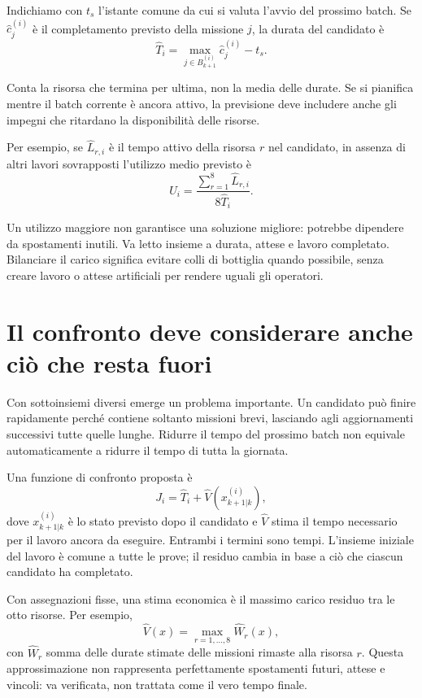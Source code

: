 \documentclass[a4paper,11pt]{article}
\begin{document}
Indichiamo con $t_s$ l'istante comune da cui si valuta l'avvio del prossimo batch. Se $\widehat c_j^{(i)}$ è il completamento previsto della missione $j$, la durata del candidato è
\begin{equation}
    \widehat T_i=\max_{j\in B_{k+1}^{(i)}}\widehat c_j^{(i)}-t_s.
\end{equation}

Conta la risorsa che termina per ultima, non la media delle durate. Se si pianifica mentre il batch corrente è ancora attivo, la previsione deve includere anche gli impegni che ritardano la disponibilità delle risorse.

Per esempio, se $\widehat L_{r,i}$ è il tempo attivo della risorsa $r$ nel candidato, in assenza di altri lavori sovrapposti l'utilizzo medio previsto è
\begin{equation}
    \widehat U_i=\frac{\sum_{r=1}^{8}\widehat L_{r,i}}{8\widehat T_i}.
\end{equation}

Un utilizzo maggiore non garantisce una soluzione migliore: potrebbe dipendere da spostamenti inutili. Va letto insieme a durata, attese e lavoro completato. Bilanciare il carico significa evitare colli di bottiglia quando possibile, senza creare lavoro o attese artificiali per rendere uguali gli operatori.

\section{Il confronto deve considerare anche ciò che resta fuori}

Con sottoinsiemi diversi emerge un problema importante. Un candidato può finire rapidamente perché contiene soltanto missioni brevi, lasciando agli aggiornamenti successivi tutte quelle lunghe. Ridurre il tempo del prossimo batch non equivale automaticamente a ridurre il tempo di tutta la giornata.

Una funzione di confronto proposta è
\begin{equation}
    J_i=\widehat T_i+\widehat V(x_{k+1|k}^{(i)}),
    \label{eq:costo}
\end{equation}
dove $x_{k+1|k}^{(i)}$ è lo stato previsto dopo il candidato e $\widehat V$ stima il tempo necessario per il lavoro ancora da eseguire. Entrambi i termini sono tempi. L'insieme iniziale del lavoro è comune a tutte le prove; il residuo cambia in base a ciò che ciascun candidato ha completato.

Con assegnazioni fisse, una stima economica è il massimo carico residuo tra le otto risorse. Per esempio,
\begin{equation}
    \widehat V(x)=\max_{r=1,\ldots,8}\widehat W_r(x),
\end{equation}
con $\widehat W_r$ somma delle durate stimate delle missioni rimaste alla risorsa $r$. Questa approssimazione non rappresenta perfettamente spostamenti futuri, attese e vincoli: va verificata, non trattata come il vero tempo finale.
\end{document}
